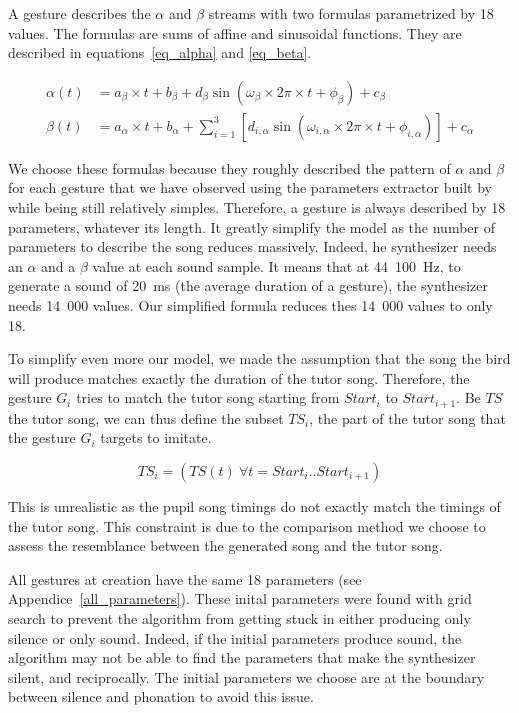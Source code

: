 \documentclass{report}
\begin{document}
A gesture describes the \(\alpha\) and \(\beta\) streams with two formulas
parametrized by 18 values. The formulas are sums of affine and sinusoidal
functions. They are described in equations~\ref{eq_alpha} and \ref{eq_beta}.

\begin{align}
  \alpha(t) &= a_\beta \times t + b_\beta + d_\beta \sin(\omega_\beta \times 2\pi \times t + \phi_\beta) + c_\beta \label{eq_alpha} \\
  \beta(t) &= a_\alpha \times t + b_\alpha
          + \sum_{i=1}^{3} \left[ d_{i, \alpha} \sin(\omega_{i, \alpha} \times 2\pi \times t
          + \phi_{i, \alpha}) \right] + c_\alpha \label{eq_beta}
\end{align}

We choose these formulas because they roughly described the pattern of
\(\alpha\) and \(\beta\) for each gesture that we have observed using the
parameters extractor built by \textcite{boari_automatic_2015} while being still
relatively simples. Therefore, a gesture is always described by 18 parameters,
whatever its length. It greatly simplify the model as the number of parameters
to describe the song reduces massively. Indeed, he synthesizer needs an
\(\alpha\) and a \(\beta\) value at each sound sample. It means that at
44~100~Hz, to generate a sound of 20~ms (the average duration of a gesture), the
synthesizer needs 14~000 values. Our simplified formula reduces thes 14~000
values to only 18.

To simplify even more our model, we made the assumption that the song the bird
will produce matches exactly the duration of the tutor song. Therefore, the
gesture $G_i$ tries to match the tutor song starting from $Start_i$ to
$Start_{i+1}$. Be $TS$ the tutor song, we can thus define the subset $TS_i$, the
part of the tutor song that the gesture $G_i$ targets to imitate.

\begin{equation}
  TS_i = (TS(t)\ \forall t = Start_i..Start_{i+1})
\end{equation}

This is unrealistic as the pupil song timings do not exactly match the timings
of the tutor song. This constraint is due to the comparison method we choose to
assess the resemblance between the generated song and the tutor song.

All gestures at creation have the same 18 parameters (see
Appendice~\ref{all_parameters}). These inital parameters were found with grid
search to prevent the algorithm from getting stuck in either producing only
silence or only sound. Indeed, if the initial parameters produce sound, the
algorithm may not be able to find the parameters that make the synthesizer
silent, and reciprocally. The initial parameters we choose are at the boundary
between silence and phonation to avoid this issue.
\end{document}
